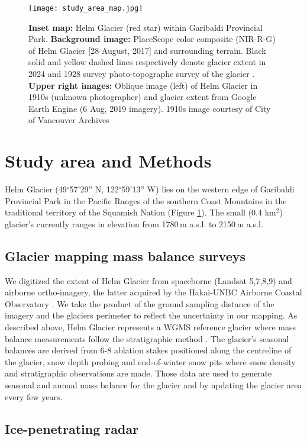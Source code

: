 \documentclass[annals,review,oneside]{igs}
\begin{document}
\begin{figure}[H!]
\centering
\texttt{[image: study\_area\_map.jpg]}
\caption{\textbf{Inset map:} Helm Glacier (red star) within Garibaldi Provincial Park. \textbf{Background image:} PlaceScope color composite (NIR-R-G) of Helm Glacier [28 August, 2017] and surrounding terrain. Black solid and yellow dashed lines respectively denote glacier extent in 2024 and 1928 survey photo-topographc survey of the glacier \citep{Koch2009}. \textbf{Upper right images:} Oblique image (left) of Helm Glacier in 1910s (unknown photographer) and glacier extent from Google Earth Engine (6 Aug, 2019 imagery). 1910s image courtesy of City of Vancouver Archives}
\label{study_area_map}
\end{figure}

\section{Study area and Methods}

Helm Glacier (49$^{\circ}$57’29” N, 122$^{\circ}$59’13” W) lies on the western edge of Garibaldi Provincial Park in the Pacific Ranges of the southern Coast Mountains in the traditional territory of the Squamish Nation (Figure \ref{study_area_map}). The small (0.4 km$^{2}$) glacier's currently ranges in elevation from 1780\,m a.s.l. to 2150\,m a.s.l. 

\subsection{Glacier mapping mass balance surveys}

We digitized the extent of Helm Glacier from spaceborne (Landsat 5,7,8,9) and airborne ortho-imagery, the latter acquired by the Hakai-UNBC Airborne Coastal Observatory \citep{Donahue2023}. We take the product of the ground sampling distance of the imagery and the glaciers perimeter to reflect the uncertainty in our mapping. As described above, Helm Glacier represents a WGMS reference glacier where mass balance measurements follow the stratigraphic method \citep{Kaser2003}. The glacier's seasonal balances are derived from 6-8 ablation stakes positioned along the centreline of the glacier, snow depth probing and end-of-winter snow pits where snow density and stratigraphic observations are made. Those data are used to generate seasonal and annual mass balance for the glacier and by updating the glacier area every few years. 

\subsection{Ice-penetrating radar}
\end{document}
